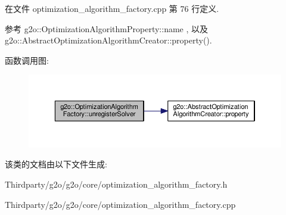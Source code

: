 在文件 optimization\-\_\-algorithm\-\_\-factory.\-cpp 第 76 行定义.



参考 g2o\-::\-Optimization\-Algorithm\-Property\-::name , 以及 g2o\-::\-Abstract\-Optimization\-Algorithm\-Creator\-::property().



函数调用图\-:
\nopagebreak
\begin{figure}[H]
\begin{center}
\leavevmode
\includegraphics[width=350pt]{classg2o_1_1OptimizationAlgorithmFactory_adf79430f6176c9e9309a703ba2dbd14b_cgraph}
\end{center}
\end{figure}




该类的文档由以下文件生成\-:\begin{DoxyCompactItemize}
\item 
Thirdparty/g2o/g2o/core/optimization\-\_\-algorithm\-\_\-factory.\-h\item 
Thirdparty/g2o/g2o/core/optimization\-\_\-algorithm\-\_\-factory.\-cpp\end{DoxyCompactItemize}
